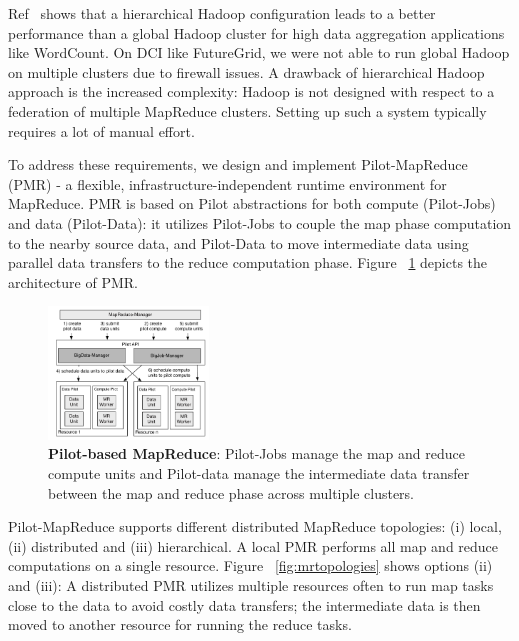 \documentclass[]{paper}
\begin{document}
Ref~\cite{weissman-mr-11} shows that a hierarchical Hadoop configuration leads to a better performance than a global Hadoop cluster for high data aggregation applications like WordCount. On DCI like FutureGrid, we were not able to run global Hadoop on multiple clusters due to firewall issues.  A drawback of hierarchical Hadoop approach is the increased complexity: Hadoop is not designed with respect to a federation of multiple MapReduce clusters. Setting up such a system typically requires a lot of manual effort.

To address these requirements, we design and implement Pilot-MapReduce (PMR) - a flexible, infrastructure-independent runtime environment for MapReduce. PMR is based on Pilot abstractions for both compute (Pilot-Jobs) and data (Pilot-Data): it utilizes Pilot-Jobs to couple the map phase computation to the nearby source data, and Pilot-Data to move intermediate data using parallel data transfers to the reduce computation phase. Figure ~\ref{fig:mr_arch} depicts the architecture of PMR. 

\begin{figure}[t]
	\centering
	\includegraphics[width=0.38\textwidth]{figures/mr-arch.pdf}
	\caption{\textbf{Pilot-based MapReduce}: Pilot-Jobs manage the map and reduce compute  units and Pilot-data manage the intermediate data transfer between the map and reduce phase across multiple clusters.}
	\label{fig:mr_arch}
\end{figure}

Pilot-MapReduce supports different distributed MapReduce topologies: (i) local, (ii) distributed and (iii) hierarchical. A local PMR performs all map and reduce computations on a single resource. Figure ~\ref{fig:mrtopologies} shows options (ii) and (iii): A distributed PMR utilizes multiple resources often to run map tasks close to the data to avoid costly data transfers; the intermediate data is then moved to another resource for running the reduce tasks. 
\end{document}
